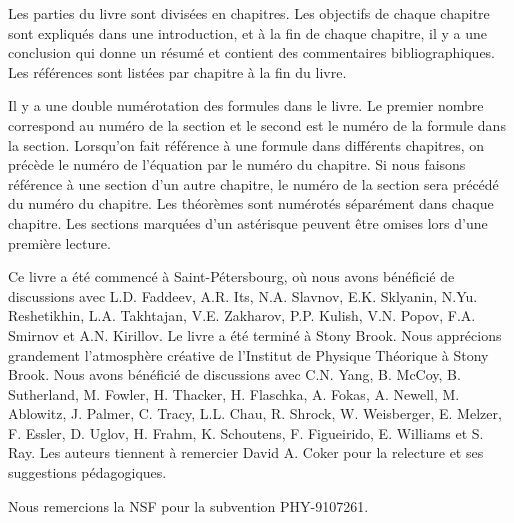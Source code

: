 Les parties du livre sont divisées en chapitres. Les objectifs de chaque chapitre sont expliqués dans une introduction, et à la fin de chaque chapitre, il y a une conclusion qui donne un résumé et contient des commentaires bibliographiques. Les références sont listées par chapitre à la fin du livre.

Il y a une double numérotation des formules dans le livre. Le premier nombre correspond au numéro de la section et le second est le numéro de la formule dans la section. Lorsqu'on fait référence à une formule dans différents chapitres, on précède le numéro de l'équation par le numéro du chapitre. Si nous faisons référence à une section d'un autre chapitre, le numéro de la section sera précédé du numéro du chapitre. Les théorèmes sont numérotés séparément dans chaque chapitre. Les sections marquées d'un astérisque peuvent être omises lors d'une première lecture.

Ce livre a été commencé à Saint-Pétersbourg, où nous avons bénéficié de discussions avec L.D. Faddeev, A.R. Its, N.A. Slavnov, E.K. Sklyanin, N.Yu. Reshetikhin, L.A. Takhtajan, V.E. Zakharov, P.P. Kulish, V.N. Popov, F.A. Smirnov et A.N. Kirillov. Le livre a été terminé à Stony Brook. Nous apprécions grandement l'atmosphère créative de l'Institut de Physique Théorique à Stony Brook. Nous avons bénéficié de discussions avec C.N. Yang, B. McCoy, B. Sutherland, M. Fowler, H. Thacker, H. Flaschka, A. Fokas, A. Newell, M. Ablowitz, J. Palmer, C. Tracy, L.L. Chau, R. Shrock, W. Weisberger, E. Melzer, F. Essler, D. Uglov, H. Frahm, K. Schoutens, F. Figueirido, E. Williams et S. Ray. Les auteurs tiennent à remercier David A. Coker pour la relecture et ses suggestions pédagogiques.

Nous remercions la NSF pour la subvention PHY-9107261.

